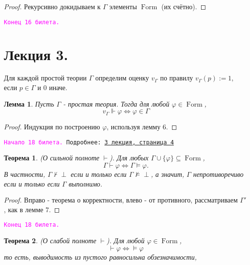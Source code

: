 \documentclass[a4paper,100pt]{article}
\theoremstyle{indented}
\newtheorem{theorem}{Теорема}
\newtheorem{lemma}{Лемма}
\theoremstyle{definition}
\theoremstyle{remark}
\DeclareMathOperator{\Llra}{\Longleftrightarrow}
\DeclareMathOperator{\form}{Form}
\begin{document}
\begin{proof}
  Рекурсивно докидываем к $\Gamma$ элементы $\form$ (их счётно).
\end{proof}

\texttt{\textcolor{magenta}{Конец 16 билета.}} 

\hrulefill

\section{Лекция 3.}

Для каждой простой теории $\Gamma$ определим оценку $v_\Gamma$ по правилу $v_\Gamma(p):=1$, если $p\in \Gamma$ и 0 иначе. \\

\begin{lemma}
  Пусть $\Gamma$ - простая теория. Тогда для любой $\varphi \in \form$, 
  \[
    v_\Gamma \Vdash \varphi \Longleftrightarrow \varphi \in \Gamma
  \]
\end{lemma}

\begin{proof}
  Индукция по построению $\varphi$, используя лемму 6.
\end{proof}

\hrulefill

\texttt{\hypertarget{b18}{\textcolor{magenta}{Начало 18 билета.}} Подробнее: \href{http://www.mi-ras.ru/~speranski/courses/logic-1-2021-spring/slides_3.pdf}{3 лекция, страница 4}} \\

\begin{theorem}
  (О сильной полноте $\vdash$). Для любых $\Gamma\cup \{\varphi\}\subseteq \form$, 
  \[
    \Gamma \vdash \varphi \Llra \Gamma \vDash \varphi. 
  \]
  В частности, $\Gamma \nvdash \perp$ если и только если $\Gamma \nvDash \perp$, а значит, $\Gamma$ непротиворечиво если и только если $\Gamma$ выполнимо.
\end{theorem}

\begin{proof}
  Вправо - теорема о корректности, влево - от противного, рассматриваем $\Gamma'$, как в лемме 7.
\end{proof}

\texttt{\textcolor{magenta}{Конец 18 билета.}} 

\hrulefill

\begin{theorem}
  (О слабой полноте $\vdash$). Для любой $\varphi \in \form$, 
  \[
    \vdash \varphi \Llra \vDash \varphi
  \]
  то есть, выводимость из пустого равносильна обзезначимости,
\end{theorem}\ 
\end{document}
